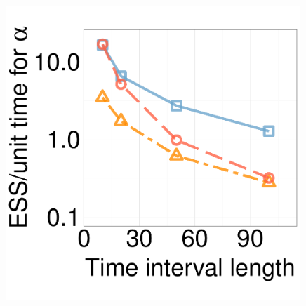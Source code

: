 
  \begin{figure}[H]    
  \centering
  \begin{minipage}[hp]{0.24\linewidth}
  \centering
    \includegraphics [width=0.99\textwidth, angle=0]{figs/new_experiment_figs/ESS_vs_t_alpha_fixobservation.pdf}
    \end{minipage}
  \begin{minipage}[hp]{0.24\linewidth}
  \centering

\end{minipage}
\end{figure}
